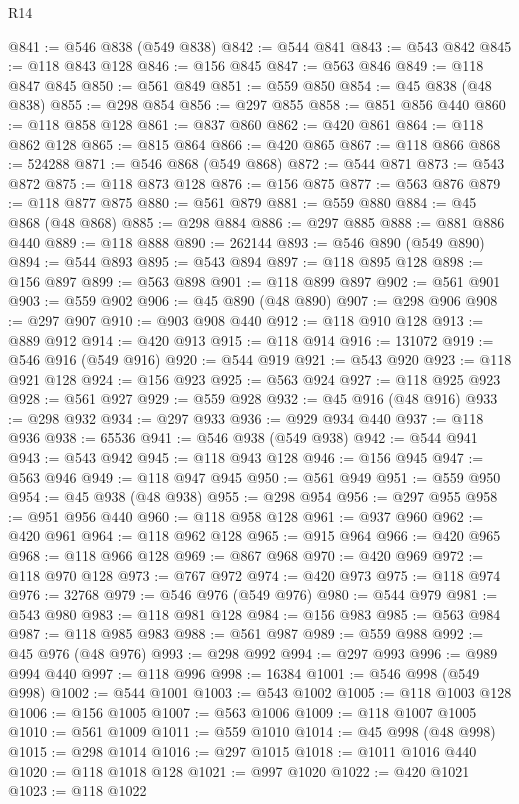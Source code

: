 \begin{lexlean}{R14}
\begin{coremodule}
@841 := @546 @838 (@549 @838)
@842 := @544 @841
@843 := @543 @842
@845 := @118 @843 @128
@846 := @156 @845
@847 := @563 @846
@849 := @118 @847 @845
@850 := @561 @849
@851 := @559 @850
@854 := @45 @838 (@48 @838)
@855 := @298 @854
@856 := @297 @855
@858 := @851 @856 @440
@860 := @118 @858 @128
@861 := @837 @860
@862 := @420 @861
@864 := @118 @862 @128
@865 := @815 @864
@866 := @420 @865
@867 := @118 @866
@868 := 524288
@871 := @546 @868 (@549 @868)
@872 := @544 @871
@873 := @543 @872
@875 := @118 @873 @128
@876 := @156 @875
@877 := @563 @876
@879 := @118 @877 @875
@880 := @561 @879
@881 := @559 @880
@884 := @45 @868 (@48 @868)
@885 := @298 @884
@886 := @297 @885
@888 := @881 @886 @440
@889 := @118 @888
@890 := 262144
@893 := @546 @890 (@549 @890)
@894 := @544 @893
@895 := @543 @894
@897 := @118 @895 @128
@898 := @156 @897
@899 := @563 @898
@901 := @118 @899 @897
@902 := @561 @901
@903 := @559 @902
@906 := @45 @890 (@48 @890)
@907 := @298 @906
@908 := @297 @907
@910 := @903 @908 @440
@912 := @118 @910 @128
@913 := @889 @912
@914 := @420 @913
@915 := @118 @914
@916 := 131072
@919 := @546 @916 (@549 @916)
@920 := @544 @919
@921 := @543 @920
@923 := @118 @921 @128
@924 := @156 @923
@925 := @563 @924
@927 := @118 @925 @923
@928 := @561 @927
@929 := @559 @928
@932 := @45 @916 (@48 @916)
@933 := @298 @932
@934 := @297 @933
@936 := @929 @934 @440
@937 := @118 @936
@938 := 65536
@941 := @546 @938 (@549 @938)
@942 := @544 @941
@943 := @543 @942
@945 := @118 @943 @128
@946 := @156 @945
@947 := @563 @946
@949 := @118 @947 @945
@950 := @561 @949
@951 := @559 @950
@954 := @45 @938 (@48 @938)
@955 := @298 @954
@956 := @297 @955
@958 := @951 @956 @440
@960 := @118 @958 @128
@961 := @937 @960
@962 := @420 @961
@964 := @118 @962 @128
@965 := @915 @964
@966 := @420 @965
@968 := @118 @966 @128
@969 := @867 @968
@970 := @420 @969
@972 := @118 @970 @128
@973 := @767 @972
@974 := @420 @973
@975 := @118 @974
@976 := 32768
@979 := @546 @976 (@549 @976)
@980 := @544 @979
@981 := @543 @980
@983 := @118 @981 @128
@984 := @156 @983
@985 := @563 @984
@987 := @118 @985 @983
@988 := @561 @987
@989 := @559 @988
@992 := @45 @976 (@48 @976)
@993 := @298 @992
@994 := @297 @993
@996 := @989 @994 @440
@997 := @118 @996
@998 := 16384
@1001 := @546 @998 (@549 @998)
@1002 := @544 @1001
@1003 := @543 @1002
@1005 := @118 @1003 @128
@1006 := @156 @1005
@1007 := @563 @1006
@1009 := @118 @1007 @1005
@1010 := @561 @1009
@1011 := @559 @1010
@1014 := @45 @998 (@48 @998)
@1015 := @298 @1014
@1016 := @297 @1015
@1018 := @1011 @1016 @440
@1020 := @118 @1018 @128
@1021 := @997 @1020
@1022 := @420 @1021
@1023 := @118 @1022

\end{coremodule}
\end{lexlean}
